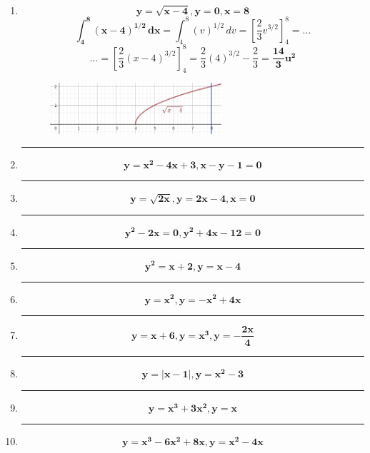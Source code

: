 \documentclass[12pt]{article}
\begin{document}
\begin{itemize}
\begin{enumerate}
                \newpage\hrule
                \item \[\bm{y = \sqrt{x - 4}, y = 0, x = 8}\]
                    \[\bm{\int_{4}^{8} (x - 4)^{1/2} \, dx} = \int_{4}^{8} (v)^{1/2} \, dv = \left[\frac{2}{3}v^{3/2}\right]_{4}^{8} = ...\]
                    \[... = \left[\frac{2}{3}(x - 4)^{3/2}\right]_{4}^{8} = \frac{2}{3}(4)^{3/2} - \frac{2}{3} = \bm{\frac{14}{3}u^2}\]
                    \begin{figure}[h!]
                        \centering
                        \includegraphics[width=0.6\textwidth]{img/t6-ej2-3.png}
                    \end{figure}

                \hrule
                \item \[\bm{y = x^2 - 4x + 3, x - y - 1 = 0}\]
            
                \hrule
                \item \[\bm{y = \sqrt{2x}, y = 2x - 4, x = 0}\]

                \hrule
                \item \[\bm{y^2 - 2x = 0, y^2 + 4x - 12 = 0}\]

                \hrule
                \item \[\bm{y^2 = x + 2, y = x - 4}\]

                \hrule
                \item \[\bm{y = x^2, y = - x^2 + 4x}\]

                \hrule
                \item \[\bm{y = x + 6, y = x^3, y = - \frac{2x}{4}}\]
                
                \hrule
                \item \[\bm{y = \left|x - 1\right|, y = x^2 - 3}\]
                
                \hrule
                \item \[\bm{y = x^3 + 3x^2, y = x}\]
                
                \hrule
                \item \[\bm{y = x^3 - 6x^2 + 8x, y = x^2 - 4x}\]

            \end{enumerate}
        

\end{itemize}
\end{document}
